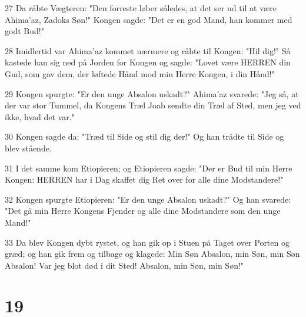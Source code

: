 \par 27 Da råbte Vægteren: "Den forreste løber således, at det ser ud til at være Ahima'az, Zadoks Søn!" Kongen sagde: "Det er en god Mand, han kommer med godt Bud!"
\par 28 Imidlertid var Ahima'az kommet nærmere og råbte til Kongen: "Hil dig!" Så kastede han sig ned på Jorden for Kongen og sagde: "Lovet være HERREN din Gud, som gav dem, der løftede Hånd mod min Herre Kongen, i din Hånd!"
\par 29 Kongen spurgte: "Er den unge Absalon uskadt?" Ahima'az svarede: "Jeg så, at der var stor Tummel, da Kongens Træl Joab sendte din Træl af Sted, men jeg ved ikke, hvad det var."
\par 30 Kongen sagde da: "Træd til Side og stil dig der!" Og han trådte til Side og blev stående.
\par 31 I det samme kom Etiopieren; og Etiopieren sagde: "Der er Bud til min Herre Kongen: HERREN har i Dag skaffet dig Ret over for alle dine Modstandere!"
\par 32 Kongen spurgte Etiopieren: "Er den unge Absalon uskadt?" Og han svarede: "Det gå min Herre Kongens Fjender og alle dine Modstandere som den unge Mand!"
\par 33 Da blev Kongen dybt rystet, og han gik op i Stuen på Taget over Porten og græd; og han gik frem og tilbage og klagede: Min Søn Absalon, min Søn, min Søn Absalon! Var jeg blot død i dit Sted! Absalon, min Søn, min Søn!"

\chapter{19}

